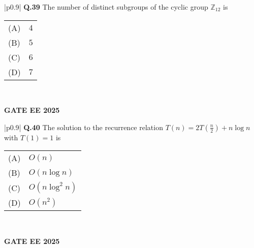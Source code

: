 \documentclass{article}
\begin{document}
\begin{table}[h]
\centering
\begin{tabular}{|p{0.9\linewidth}|}
\hline
\textbf{Q.39} The number of distinct subgroups of the cyclic group $\mathbb{Z}_{12}$ is \\
\hline
\begin{tabular}{ll}
(A) & $4$ \\
(B) & $5$ \\
(C) & $6$ \\
(D) & $7$ \\
\end{tabular} \\
\hline
\end{tabular}
\end{table}
\textbf{GATE EE 2025}

\begin{table}[h]
\centering
\begin{tabular}{|p{0.9\linewidth}|}
\hline
\textbf{Q.40} The solution to the recurrence relation $T(n) = 2T\left(\frac{n}{2}\right) + n\log n$ with $T(1) = 1$ is \\
\hline
\begin{tabular}{ll}
(A) & $O(n)$ \\
(B) & $O(n\log n)$ \\
(C) & $O(n\log^2 n)$ \\
(D) & $O(n^2)$ \\
\end{tabular} \\
\hline
\end{tabular}
\end{table}
\textbf{GATE EE 2025}
\end{document}
